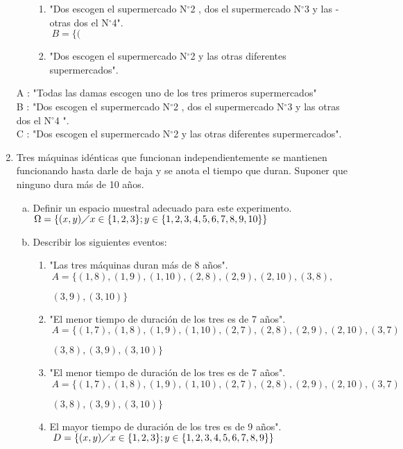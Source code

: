 \documentclass[12pt]{article}
\begin{document}
\begin{enumerate}
\begin{enumerate}[(a)]
\begin{enumerate}[A: ]
\item "Dos escogen el supermercado N$^{\circ}$2 , dos el supermercado N$^{\circ}$3 y las -
otras dos el N$^{\circ}$4".\\
$\ B=\lbrace (           $                             

\item "Dos escogen el supermercado N$^{\circ}$2 y las otras diferentes supermercados".

\end{enumerate}
\end{enumerate}
A : "Todas las damas escogen uno de los tres primeros supermercados"\\
B : "Dos escogen el supermercado N$^{\circ}$2 , dos el supermercado  N$^{\circ}$3 y las otras dos el N$^{\circ}$4 ".\\
C : "Dos escogen el supermercado N$^{\circ}$2 y las otras diferentes supermercados".
\item Tres máquinas idénticas que funcionan independientemente se mantienen funcionando hasta darle de baja y se anota el tiempo que duran. Suponer que ninguno dura más de 10 años.\\
\begin{enumerate}[(a)]
\item Definir un espacio muestral adecuado para este experimento.\\
$\Omega=\lbrace (x,y) \diagup x \in \lbrace1,2,3\rbrace ; y \in \lbrace1,2,3,4,5,6,7,8,9,10\rbrace \rbrace$
\item Describir los siguientes eventos:
\begin{enumerate}[A: ]

\item "Las tres máquinas duran más de 8 años".\\[0.2cm]
$\ A=\lbrace (1,8),(1,9),(1,10),(2,8),(2,9),(2,10),(3,8),$

$ \ (3,9),(3,10)\rbrace$

\item "El menor tiempo de duración de los tres es de 7 años".\\
$\ A=\lbrace (1,7),(1,8),(1,9),(1,10),(2,7),(2,8),(2,9),(2,10),(3,7)$

$\ (3,8),(3,9),(3,10)\rbrace$

\item "El menor tiempo de duración de los tres es de 7 años".\\
$\ A=\lbrace (1,7),(1,8),(1,9),(1,10),(2,7),(2,8),(2,9),(2,10),(3,7)$


$\ (3,8),(3,9),(3,10)\rbrace$
\item El mayor tiempo de duración de los tres es de 9 años".\\
$\ D=\lbrace (x,y) \diagup x \in \lbrace1,2,3\rbrace ; y \in \lbrace1,2,3,4,5,6,7,8,9\rbrace \rbrace$



\end{enumerate}
\end{enumerate}
\end{enumerate}
\end{document}
